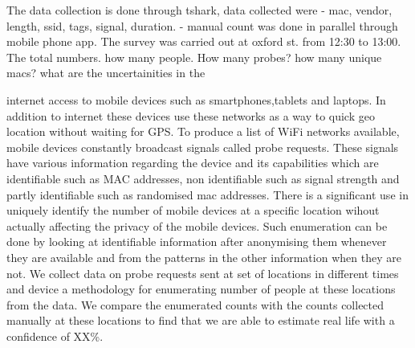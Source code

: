 \documentclass[11t, a4paper, twocolumn]{article}
\begin{document}
	The data collection is done through tshark, data collected were - mac,
	vendor, length, ssid, tags, signal, duration. - manual count was done in
	parallel through mobile phone app. The survey was carried out at oxford st.
	from 12:30 to 13:00. The total numbers. how many people. How many probes?
	how many unique macs? what are the uncertainities in the 

	
	internet access to mobile devices such as smartphones,tablets and laptops.
	In addition to internet these devices use these networks as a way to quick 
	geo location without waiting for GPS.
	To produce a list of WiFi networks available, mobile devices constantly 
	broadcast signals called probe requests.
	These signals have various information regarding the device and its 
	capabilities which are identifiable such as MAC addresses, non identifiable 
	such as signal strength and partly identifiable such as randomised mac 
	addresses.
	There is a significant use in uniquely identify the number of mobile devices
	at a specific location wihout actually affecting the privacy of the mobile
	devices.
	Such enumeration can be done by looking at identifiable information after 
	anonymising them whenever they are available and from the patterns in the 
	other information when they are not.
	We collect data on probe requests sent at set of locations in 
	different times and device a methodology for enumerating number of people
	at these locations from the data.
	We compare the enumerated counts with the counts collected manually at
	these locations to find that we are able to estimate real life with a 
	confidence of XX\%.
	
	\citep{vanhoef2016}
	\citep{matte2016}
	\citep{martin2017}
	\citep{vo2016}
	\citep{konto2017}

	\printbibliography[title={References}]
\end{document}
